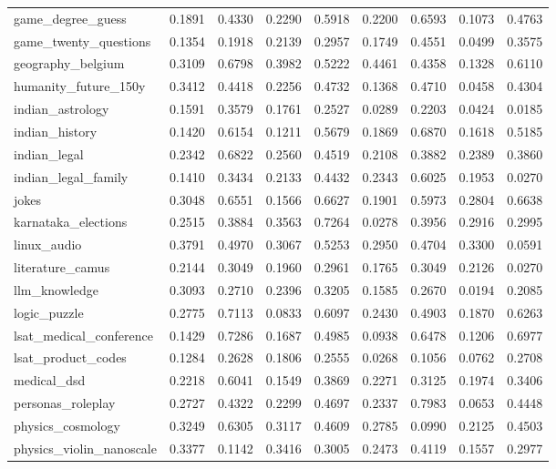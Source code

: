 \begin{landscape}
\begin{longtable}{@{}p{3.8cm}cccccccc@{}}
game\_degree\_guess & 0.1891 & 0.4330 & 0.2290 & 0.5918 & 0.2200 & 0.6593 & 0.1073 & 0.4763 \\
game\_twenty\_questions & 0.1354 & 0.1918 & 0.2139 & 0.2957 & 0.1749 & 0.4551 & 0.0499 & 0.3575 \\
geography\_belgium & 0.3109 & 0.6798 & 0.3982 & 0.5222 & 0.4461 & 0.4358 & 0.1328 & 0.6110 \\
humanity\_future\_150y & 0.3412 & 0.4418 & 0.2256 & 0.4732 & 0.1368 & 0.4710 & 0.0458 & 0.4304 \\
indian\_astrology & 0.1591 & 0.3579 & 0.1761 & 0.2527 & 0.0289 & 0.2203 & 0.0424 & 0.0185 \\
indian\_history & 0.1420 & 0.6154 & 0.1211 & 0.5679 & 0.1869 & 0.6870 & 0.1618 & 0.5185 \\
indian\_legal & 0.2342 & 0.6822 & 0.2560 & 0.4519 & 0.2108 & 0.3882 & 0.2389 & 0.3860 \\
indian\_legal\_family & 0.1410 & 0.3434 & 0.2133 & 0.4432 & 0.2343 & 0.6025 & 0.1953 & 0.0270 \\
jokes & 0.3048 & 0.6551 & 0.1566 & 0.6627 & 0.1901 & 0.5973 & 0.2804 & 0.6638 \\
karnataka\_elections & 0.2515 & 0.3884 & 0.3563 & 0.7264 & 0.0278 & 0.3956 & 0.2916 & 0.2995 \\
linux\_audio & 0.3791 & 0.4970 & 0.3067 & 0.5253 & 0.2950 & 0.4704 & 0.3300 & 0.0591 \\
literature\_camus & 0.2144 & 0.3049 & 0.1960 & 0.2961 & 0.1765 & 0.3049 & 0.2126 & 0.0270 \\
llm\_knowledge & 0.3093 & 0.2710 & 0.2396 & 0.3205 & 0.1585 & 0.2670 & 0.0194 & 0.2085 \\
logic\_puzzle & 0.2775 & 0.7113 & 0.0833 & 0.6097 & 0.2430 & 0.4903 & 0.1870 & 0.6263 \\
lsat\_medical\_conference & 0.1429 & 0.7286 & 0.1687 & 0.4985 & 0.0938 & 0.6478 & 0.1206 & 0.6977 \\
lsat\_product\_codes & 0.1284 & 0.2628 & 0.1806 & 0.2555 & 0.0268 & 0.1056 & 0.0762 & 0.2708 \\
medical\_dsd & 0.2218 & 0.6041 & 0.1549 & 0.3869 & 0.2271 & 0.3125 & 0.1974 & 0.3406 \\
personas\_roleplay & 0.2727 & 0.4322 & 0.2299 & 0.4697 & 0.2337 & 0.7983 & 0.0653 & 0.4448 \\
physics\_cosmology & 0.3249 & 0.6305 & 0.3117 & 0.4609 & 0.2785 & 0.0990 & 0.2125 & 0.4503 \\
physics\_violin\_nanoscale & 0.3377 & 0.1142 & 0.3416 & 0.3005 & 0.2473 & 0.4119 & 0.1557 & 0.2977 \\

\end{longtable}
\end{landscape}
